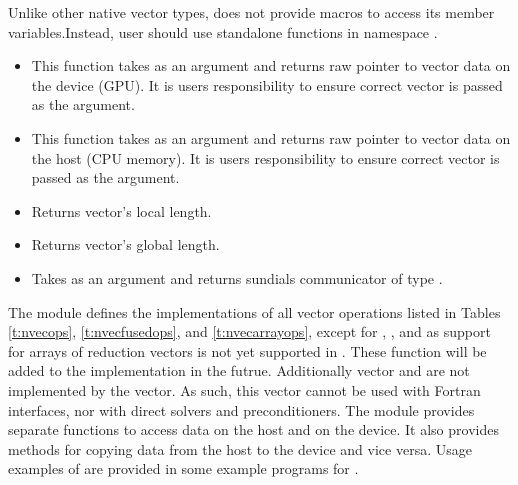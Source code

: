 Unlike other native {\sundials} vector types, {\nvecraja} does not provide macros
to access its member variables.Instead, user should use standalone functions in
namespace .
\begin{itemize}

\item

  This function takes  as an argument and returns raw pointer to vector
  data on the device (GPU). It is users responsibility to ensure correct vector is
  passed as the argument.

\item

  This function takes  as an argument and returns raw pointer to vector
  data on the host (CPU memory). It is users responsibility to ensure correct vector is
  passed as the argument.

\item {}

  Returns vector's local length.


\item {}

  Returns vector's global length.


\item {}

  Takes  as an argument and returns sundials communicator of type
  .

\end{itemize}


The {\nvecraja} module defines the implementations of all vector operations listed
in Tables \ref{t:nvecops}, \ref{t:nvecfusedops}, and \ref{t:nvecarrayops}, except
for , , and
 as support for arrays of reduction vectors is not
yet supported in {\raja}. These function will be added to the {\nvecraja}
implementation in the futrue. Additionally vector  and
 are not implemented by the {\raja} vector.
As such, this vector cannot be used with {\sundials} Fortran interfaces,
nor with {\sundials} direct solvers and preconditioners.
The {\nvecraja} module provides separate functions to access data on the host
and on the device. It also provides methods for copying data from the host to
the device and vice versa. Usage examples of {\nvecraja} are provided in
some example programs for {\cvode} \cite{cvode_ex}.

